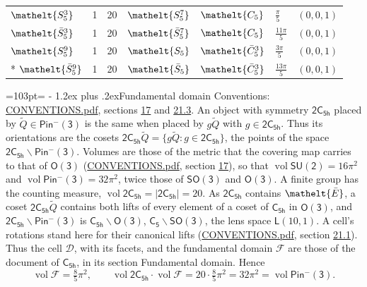 \documentclass[10pt,a4paper]{article}
\makeatletter
\renewcommand\section{\@startsection{section}{1}{\z@}{-3ex plus -1ex minus -.2ex}%
  {1.2ex plus .2ex}{\normalfont\large\sffamily\bfseries\color{parttitle}}}
\newcommand{\needspace}[1]{\par\penalty-100\begingroup\dimen0=#1\relax\dimen2=\pagegoal
  \advance\dimen2-\pagetotal\ifdim\dimen0>\dimen2\relax\ifdim\dimen2>0pt\vfil\break\fi\fi
  \endgroup}
\numberwithin{equation}{section}
\newcommand{\eltfont}[1]{{\let\sigma\eltsigma\mathelt{#1}}}
\newcommand{\grp}[1]{\mathsf{#1}}
\newcommand{\cls}[1]{\eltfont{#1}}
\newcommand{\elt}[1]{\eltfont{#1}}
\newcommand{\dirvec}[3]{(#1, #2, #3)}
\newcommand{\vol}{\operatorname{vol}}
\newcommand{\fcell}{\mathcal{D}}
\newcommand{\fdomain}{\mathcal{F}}
\newcommand{\lensspace}[2]{\mathsf{L}(#1, #2)}
\newcommand{\barred}[1]{\bar{#1}}
\newcommand{\lift}[1]{\tilde{#1}}
\makeatother
\begin{document}
{\begin{longtable}{@{}lrrllll@{}}
$\cls{S_{5}^{3}}$ & 1 & 20 & $\cls{S_{5}^{7}}$ & $\cls{C_{5}}$ & $\tfrac{\pi}{5}$ & $\dirvec{0}{0}{1}$\\
$\cls{\barred{S}_{5}^{3}}$ & 1 & 20 & $\cls{\barred{S}_{5}^{7}}$ & $\cls{C_{5}}$ & $\tfrac{11\pi}{5}$ & $\dirvec{0}{0}{1}$\\
$\cls{S_{5}^{9}}$ & 1 & 20 & $\cls{S_{5}}$ & $\cls{\barred{C}_{5}^{3}}$ & $\tfrac{3\pi}{5}$ & $\dirvec{0}{0}{1}$\\*
$\cls{\barred{S}_{5}^{9}}$ & 1 & 20 & $\cls{\barred{S}_{5}}$ & $\cls{\barred{C}_{5}^{3}}$ & $\tfrac{13\pi}{5}$ & $\dirvec{0}{0}{1}$\\
\bottomrule\end{longtable}}
\needspace{103pt}
\section{Fundamental domain}\label{s:fundamental_domain}
Conventions: \href{../../CONVENTIONS.pdf}{CONVENTIONS.pdf}, sections \href{../../../rotation/CONVENTIONS.pdf\#conv.17}{17} and \href{../../CONVENTIONS.pdf\#conv.21.3}{21.3}.
An object with symmetry $\grp{2C_{5h}}$ placed by $\lift{Q} \in \grp{Pin^{-}(3)}$ is the same when placed by $g\lift{Q}$ with $g \in \grp{2C_{5h}}$. \label{n:operator.cosets}Thus its orientations are the cosets $\grp{2C_{5h}}\lift{Q} = \{g\lift{Q} : g \in \grp{2C_{5h}}\}$, the points of the space $\grp{2C_{5h}}\backslash\grp{Pin^{-}(3)}$. \label{n:operator.volume}Volumes are those of the metric that the covering map carries to that of \href{../../../rotation/data/pdf/O3.pdf}{$\grp{O(3)}$} (\href{../../CONVENTIONS.pdf}{CONVENTIONS.pdf}, section \href{../../../rotation/CONVENTIONS.pdf\#conv.17}{17}), so that $\vol\grp{SU(2)} = 16\pi^2$ and $\vol\grp{Pin^{-}(3)} = 32\pi^2$, twice those of $\grp{SO(3)}$ and $\grp{O(3)}$. A finite group has the counting measure, $\vol\grp{2C_{5h}} = |\grp{2C_{5h}}| = 20$.
\leavevmode\label{n:set.lens}As $\grp{2C_{5h}}$ contains $\elt{\barred{E}}$, a coset $\grp{2C_{5h}}\lift{Q}$ contains both lifts of every element of a coset of \href{../../../rotation/data/pdf/C5h.pdf}{$\grp{C_{5h}}$} in $\grp{O(3)}$, and $\grp{2C_{5h}}\backslash\grp{Pin^{-}(3)}$ is $\grp{C_{5h}}\backslash\grp{O(3)}$, $\grp{C_{5}}\backslash\grp{SO(3)}$, the lens space $\lensspace{10}{1}$. A cell's rotations stand here for their canonical lifts (\href{../../CONVENTIONS.pdf}{CONVENTIONS.pdf}, section \href{../../CONVENTIONS.pdf\#conv.21.1}{21.1}). \label{n:set.cell}\label{n:set.fundamental}Thus the cell $\fcell$, with its facets, and the fundamental domain $\fdomain$ are those of the document of \href{../../../rotation/data/pdf/C5h.pdf}{$\grp{C_{5h}}$}, in its section Fundamental domain. Hence
\begin{equation}\label{e:volume}\vol\fdomain = \tfrac{8}{5}\pi^2,\qquad \vol\grp{2C_{5h}}\cdot\vol\fdomain = 20\cdot \tfrac{8}{5}\pi^2 = 32\pi^2 = \vol\grp{Pin^{-}(3)}.\end{equation}
\end{document}
